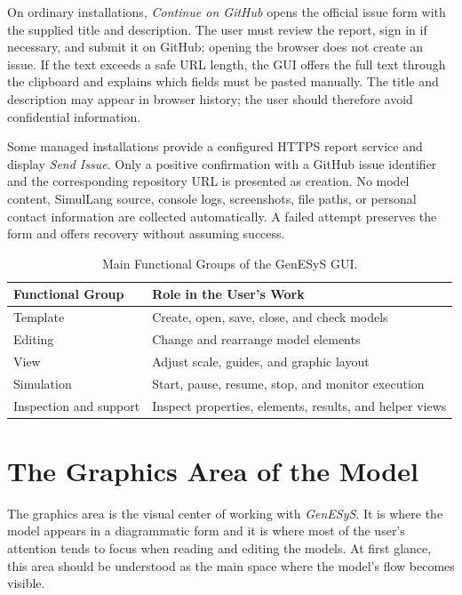On ordinary installations, \textit{Continue on GitHub} opens the official
issue form with the supplied title and description. The user must review the
report, sign in if necessary, and submit it on GitHub; opening the browser
does not create an issue. If the text exceeds a safe URL length, the GUI
offers the full text through the clipboard and explains which fields must be
pasted manually. The title and description may appear in browser history;
the user should therefore avoid confidential information.

Some managed installations provide a configured HTTPS report service and
display \textit{Send Issue}. Only a positive confirmation with a GitHub issue
identifier and the corresponding repository URL is presented as creation.
No model content, SimulLang source, console logs, screenshots, file paths,
or personal contact information are collected automatically. A failed
attempt preserves the form and offers recovery without assuming success.

\begin{table}[htbp]
\centering
\caption{Main Functional Groups of the GenESyS GUI.}
 \label{tab:cap3_grupos_funcionais}
\small
\begin{tabular}{|p{3.6cm}|p{7.0cm}|}
\hline
\textbf{Functional Group} & \textbf{Role in the User's Work} \\
\hline
Template & Create, open, save, close, and check models\\
\hline
Editing & Change and rearrange model elements \\
\hline
View & Adjust scale, guides, and graphic layout \\
\hline
Simulation & Start, pause, resume, stop, and monitor execution \\
\hline
Inspection and support & Inspect properties, elements, results, and helper views \\
\hline
 \end{tabular}
\end{table}

\section{The Graphics Area of the Model}
\label{sec:cap3_area_grafica_modelo}

The graphics area is the visual center of working with \textit{GenESyS}. It is where the model appears in a diagrammatic form and it is where most of the user's attention tends to focus when reading and editing the models. At first glance, this area should be understood as the main space where the model's flow becomes visible.

